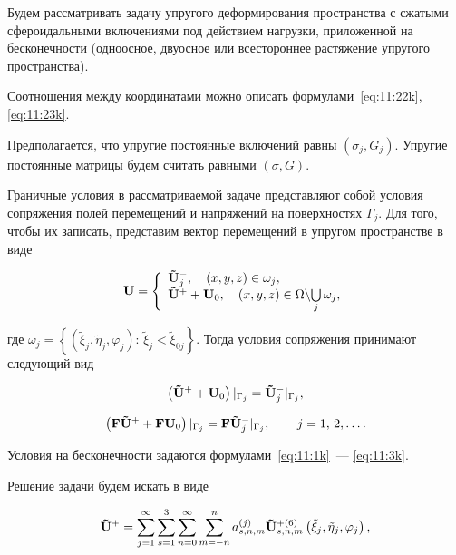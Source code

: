 Будем рассматривать задачу упругого деформирования пространства с сжатыми сфероидальными включениями под действием нагрузки, приложенной на бесконечности (одноосное, двуосное или всестороннее растяжение упругого пространства).

Соотношения между координатами можно описать формулами~\eqref{eq:11:22k}, \eqref{eq:11:23k}.

Предполагается, что упругие постоянные включений равны $(\sigma_j,G_j)$. Упругие постоянные матрицы будем считать равными $(\sigma,G)$.

Граничные условия в рассматриваемой задаче представляют собой условия сопряжения полей перемещений и напряжений на поверхностях $\Gamma_j$. Для того, чтобы их записать, представим вектор перемещений в упругом пространстве в виде

\begin{equation}
{\bf{U}} = \left\{ {\begin{array}{*{20}{l}}
{{\bf{\tilde U}}_j^ - ,\quad \left( {x,y,z} \right) \in \omega_j,}\\
{{{{\bf{\tilde U}}}^ + } + {{\bf{U}}_0},\quad \left( {x,y,z} \right) \in\Omega\backslash {\bigcup\limits_j\omega_j},}
\end{array}} \right.
\label{eq:11:23l}
\end{equation}

\noindent где $\omega_j = \left\{ {\left( {{\tilde\xi_j},{\tilde\eta _j},{\varphi _j}} \right):\, {\tilde\xi_j} < {\tilde\xi_{0j}}} \right\}$. Тогда условия сопряжения принимают следующий вид

\begin{equation}
\left( {{{{\bf{\tilde U}}}^ + } + {{\bf{U}}_0}} \right){|_{{\Gamma _j}}} = {\bf{\tilde U}}_j^ - {|_{{\Gamma _j}}},
\label{eq:11:24l}
\end{equation}

\begin{equation}
\left( {{\bf{F\tilde U^+}} + {\bf{F}}{{\bf{U}}_0}} \right){|_{{\Gamma _j}}} = {\bf{F}}{{\bf{\tilde U^-}}_j}{|_{{\Gamma _j}}},\qquad {\kern 1pt} j = 1,{\mkern 1mu} {\kern 1pt} 2,\dots.
\label{eq:11:25l}
\end{equation}

\noindent Условия на бесконечности задаются формулами~\eqref{eq:11:1k}~--- \eqref{eq:11:3k}.

Решение задачи будем искать в виде

\begin{equation}
{\bf{\tilde U^+}} = \sum\limits_{j = 1}^\infty {\sum\limits_{s = 1}^3 {\sum\limits_{n = 0}^\infty  {\sum\limits_{m=-n}^{n} {a_{s,n,m}^{(j)}} } } } {\bf{\tilde U}}_{s,n,m}^{ + (6)}\left( {{\tilde\xi_j},{\tilde\eta _j},{\varphi _j}} \right),
\label{eq:11:26l}
\end{equation}

